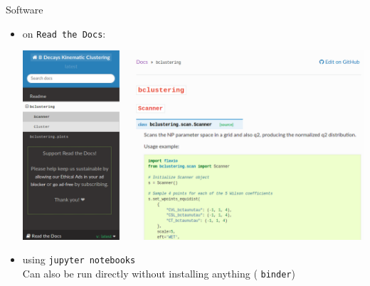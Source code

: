 \begin{frame}{Software}
    \begin{itemize}
        \item {} on  \texttt{Read the Docs}:\\[3ex]
        \begin{center}\includegraphics[width=0.8\linewidth]{figures/scrot/readthedocs.png}\end{center}
        \vspace{2ex}
        \item {} using  \texttt{jupyter notebooks}\\
        Can also be run directly without installing anything ( \texttt{binder})
    \end{itemize}
    
    \bigskip
    
\end{frame}

